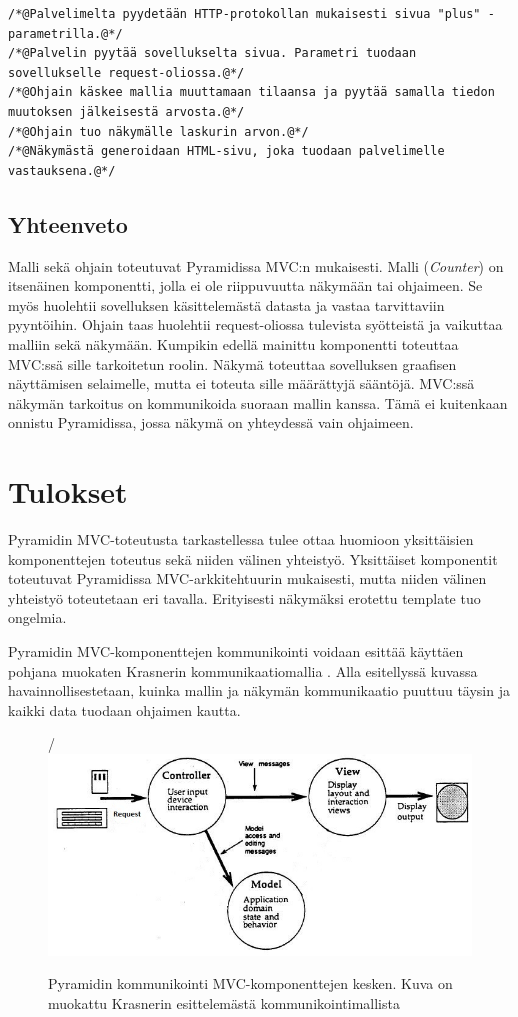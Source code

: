 \documentclass[finnish,utf8,nonumbib,palatino,kandi]{gradu2}
\begin{document}
\begin{lstlisting}
/*@Palvelimelta pyydetään HTTP-protokollan mukaisesti sivua "plus" -parametrilla.@*/
/*@Palvelin pyytää sovellukselta sivua. Parametri tuodaan sovellukselle request-oliossa.@*/
/*@Ohjain käskee mallia muuttamaan tilaansa ja pyytää samalla tiedon muutoksen jälkeisestä arvosta.@*/
/*@Ohjain tuo näkymälle laskurin arvon.@*/
/*@Näkymästä generoidaan HTML-sivu, joka tuodaan palvelimelle vastauksena.@*/
\end{lstlisting}

\subsection{Yhteenveto}
Malli sekä ohjain toteutuvat Pyramidissa MVC:n mukaisesti. Malli (\emph{Counter}) on itsenäinen komponentti, jolla ei ole riippuvuutta näkymään tai ohjaimeen. Se myös huolehtii sovelluksen käsittelemästä datasta ja vastaa tarvittaviin pyyntöihin. Ohjain taas huolehtii request-oliossa tulevista syötteistä ja vaikuttaa malliin sekä näkymään.  Kumpikin edellä mainittu komponentti toteuttaa MVC:ssä sille tarkoitetun roolin. Näkymä toteuttaa sovelluksen graafisen näyttämisen selaimelle, mutta ei toteuta sille määrättyjä sääntöjä. MVC:ssä näkymän tarkoitus on kommunikoida suoraan mallin kanssa. Tämä ei kuitenkaan onnistu Pyramidissa, jossa näkymä on yhteydessä vain ohjaimeen.

\section{Tulokset}
Pyramidin MVC-toteutusta tarkastellessa tulee ottaa huomioon yksittäisien komponenttejen toteutus sekä niiden välinen yhteistyö. Yksittäiset komponentit toteutuvat Pyramidissa MVC-arkkitehtuurin mukaisesti, mutta niiden välinen yhteistyö
toteutetaan eri tavalla. Erityisesti näkymäksi erotettu template tuo ongelmia.

Pyramidin MVC-komponenttejen kommunikointi voidaan esittää käyttäen pohjana muokaten Krasnerin kommunikaatiomallia \cite{Krasner:desc}.
Alla esitellyssä kuvassa havainnollisestetaan, kuinka mallin ja näkymän kommunikaatio puuttuu täysin ja kaikki data tuodaan ohjaimen kautta.
\newpage
\begin{figure}[h]
\centering/
\includegraphics[scale=0.85]{pyramid_mvc.jpg}
\caption{Pyramidin kommunikointi MVC-komponenttejen kesken. Kuva on muokattu Krasnerin esittelemästä kommunikointimallista \cite{Krasner:desc}  }
\end{figure}
\end{document}
